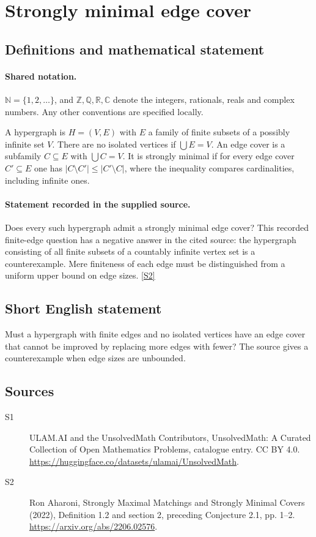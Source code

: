 \documentclass[11pt]{article}
\newcommand{\sref}[2]{\hyperlink{source:#1:#2}{[S#2]}}
\begin{document}
\section{Strongly minimal edge cover}\label{statement}

\subsection{Definitions and mathematical statement}

\paragraph{Shared notation.}$\mathbb N=\{1,2,\ldots\}$, and $\mathbb Z,\mathbb Q,\mathbb R,\mathbb C$ denote the integers, rationals, reals and complex numbers. Any other conventions are specified locally.


A hypergraph is $H=(V,E)$ with $E$ a family of finite subsets of a possibly infinite set $V$. There are no isolated vertices if $\bigcup E=V$. An edge cover is a subfamily $C\subseteq E$ with $\bigcup C=V$. It is strongly minimal if for every edge cover $C'\subseteq E$ one has $|C\setminus C'|\leq|C'\setminus C|$, where the inequality compares cardinalities, including infinite ones.
\paragraph{Statement recorded in the supplied source.}
Does every such hypergraph admit a strongly minimal edge cover? This recorded finite-edge question has a negative answer in the cited source: the hypergraph consisting of all finite subsets of a countably infinite vertex set is a counterexample. Mere finiteness of each edge must be distinguished from a uniform upper bound on edge sizes. \sref{statement}{2}
\subsection{Short English statement}
Must a hypergraph with finite edges and no isolated vertices have an edge cover that cannot be improved by replacing more edges with fewer? The source gives a counterexample when edge sizes are unbounded.
\subsection{Sources}
\begin{description}
\item[\hypertarget{source:statement:1}{S1}] ULAM.AI and the UnsolvedMath Contributors, UnsolvedMath: A Curated Collection of Open Mathematics Problems, catalogue entry. CC BY 4.0. \url{https://huggingface.co/datasets/ulamai/UnsolvedMath}.
\item[\hypertarget{source:statement:2}{S2}] Ron Aharoni, Strongly Maximal Matchings and Strongly Minimal Covers (2022), Definition 1.2 and section 2, preceding Conjecture 2.1, pp. 1--2. \url{https://arxiv.org/abs/2206.02576}.
\end{description}
\label{end:statement}
\end{document}
